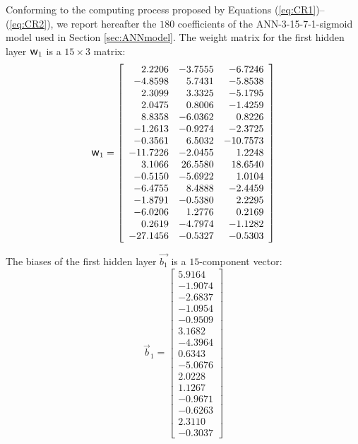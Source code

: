 \documentclass[metals,article,accept,pdftex,moreauthors]{Definitions/mdpi}
\DeclareRobustCommand{\w}{\mbox{\large\ensuremath{\mathsf{w}}}}
\begin{document}
Conforming to the computing process proposed by Equations (\ref{eq:CR1})--(\ref{eq:CR2}), we report hereafter the $180$ coefficients of the ANN-3-15-7-1-sigmoid model used in Section \ref{sec:ANNmodel}.
The weight matrix for the first hidden layer $\w_1$ is a $15\times3$ matrix:
\begin{equation*}
\w_1 = \left[
\begin{array}{rrr}
2.2206 & -3.7555 & -6.7246 \\
-4.8598 & 5.7431 & -5.8538 \\
2.3099 & 3.3325 & -5.1795 \\
2.0475 & 0.8006 & -1.4259 \\
8.8358 & -6.0362 & 0.8226 \\
-1.2613 & -0.9274 & -2.3725 \\
-0.3561 & 6.5032 & -10.7573 \\
-11.7226 & -2.0455 & 1.2248 \\
3.1066 & 26.5580 & 18.6540 \\
-0.5150 & -5.6922 & 1.0104 \\
-6.4755 & 8.4888 & -2.4459 \\
-1.8791 & -0.5380 & 2.2295 \\
-6.0206 & 1.2776 & 0.2169 \\
0.2619 & -4.7974 & -1.1282 \\
-27.1456 & -0.5327 & -0.5303
\end{array}\right]
\end{equation*}

The biases of the first hidden layer $\overrightarrow{b_1}$ is a $15$-component vector:
\begin{equation*}
\overrightarrow{b}_1 = \left[
\begin{array}{r}
5.9164 \\
-1.9074 \\
-2.6837 \\
-1.0954 \\
-0.9509 \\
3.1682 \\
-4.3964 \\
0.6343 \\
-5.0676 \\
2.0228 \\
1.1267 \\
-0.9671 \\
-0.6263 \\
2.3110 \\
-0.3037
\end{array}\right]
\end{equation*}
\end{document}
